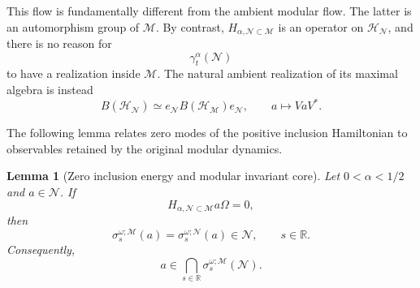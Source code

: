 \documentclass[a4paper,11pt]{article}
\newtheorem{lemma}[theorem]{Lemma}
\theoremstyle{definition}
\newcommand{\mN}{\mathcal{N}}
\newcommand{\mH}{\mathcal{H}}
\newcommand{\mM}{\mathcal{M}}
\begin{document}
This flow is fundamentally different from the ambient modular flow.
The latter is an automorphism group of $\mM$. By contrast,
$H_{\alpha,\mN\subset\mM}$ is an operator on $\mH_{\mN}$, and there is
no reason for
\begin{equation}
    \gamma_t^\alpha(\mN)
\end{equation}
to have a realization inside $\mM$. The natural ambient realization
of its maximal algebra is instead
\begin{equation}
    B(\mH_{\mN})
    \simeq
    e_{\mN}B(\mH_{\mM})e_{\mN},
    \qquad
    a\longmapsto VaV^* .
    \label{eq:BHN-corner}
\end{equation}

The following lemma relates zero modes of the positive inclusion Hamiltonian
to observables retained by the original modular dynamics.

\begin{lemma}[Zero inclusion energy and modular invariant core]
\label{lem:zero-energy-modular-memory}
Let $0<\alpha<1/2$ and $a\in\mN$. If
\begin{equation}
    H_{\alpha,\mN\subset\mM}a\Omega=0,
    \label{eq:Halpha-zero-a}
\end{equation}
then
\begin{equation}
    \sigma_s^{\omega;\mM}(a)
    =
    \sigma_s^{\omega;\mN}(a)
    \in\mN,
    \qquad
    s\in\mathbb R .
    \label{eq:zero-energy-intertwining}
\end{equation}
Consequently,
\begin{equation}
    a
    \in
    \bigcap_{s\in\mathbb R}
    \sigma_s^{\omega;\mM}(\mN).
    \label{eq:zero-energy-memory}
\end{equation}
\end{lemma}
\end{document}
